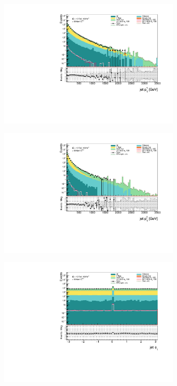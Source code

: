\documentclass[12pt, a4paper]{book}
\begin{document}
\begin{figure}[!ht]
    \centering
    \begin{subfigure}[b]{0.49\textwidth}
        \centering
        \includegraphics[width=\textwidth]{pt1_jet.pdf}
    \end{subfigure}
    \hfill
    \begin{subfigure}[b]{0.49\textwidth}
        \centering
        \includegraphics[width=\textwidth]{pt2_jet.pdf}
    \end{subfigure}
    \begin{subfigure}[b]{0.49\textwidth}
        \centering
        \includegraphics[width=\textwidth]{phi1_jet.pdf}

\end{subfigure}
\end{figure}
\end{document}
